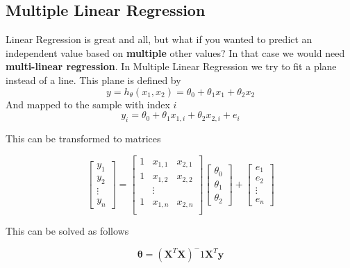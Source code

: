 \documentclass[11pt]{article}
\begin{document}
\subsection{Multiple Linear Regression}

Linear Regression is great and all, but what if you wanted to predict an independent value based on \textbf{multiple} other values? In that case we would need \textbf{multi-linear regression}.
\noindent
In Multiple Linear Regression we try to fit a plane instead of a line. This plane is defined by
\begin{equation}
    y = h_\theta(x_1,x_2) = \theta_0 + \theta_1 x_1 + \theta_2 x_2
\end{equation}
And mapped to the sample with index $i$
\begin{equation*}
    y_i = \theta_0 + \theta_1 x_{1,i} + \theta_2 x_{2,i} + e_i
\end{equation*}

This can be transformed to matrices

\begin{equation*}
    \begin{bmatrix}
        y_1    \\
        y_2    \\
        \vdots \\
        y_n
    \end{bmatrix}
    =
    \begin{bmatrix}
        1 & x_{1,1} & x_{2,1} \\
        1 & x_{1,2} & x_{2,2} \\
          & \vdots  &         \\
        1 & x_{1,n} & x_{2,n} \\
    \end{bmatrix}
    \begin{bmatrix}
        \theta_0 \\
        \theta_1 \\
        \theta_2
    \end{bmatrix}
    +
    \begin{bmatrix}
        e_1    \\
        e_2    \\
        \vdots \\
        e_n
    \end{bmatrix}
\end{equation*}

This can be solved as follows

\begin{equation*}
    \bm{\theta} = (\bm{X}^T\bm{X})^-1\bm{X}^T\bm{y}
\end{equation*}
\end{document}
